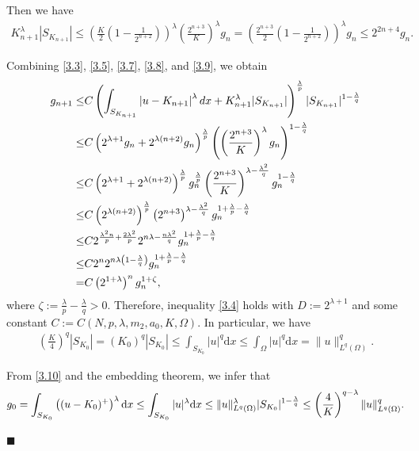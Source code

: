 \documentclass[onecolumn]{autart}
\newenvironment{proof}{{\it Proof: \enspace}}{\hfill $\blacksquare$\par}
\begin{document}
\begin{proof}
		Then we have
		\begin{align}\label{3.9}
			K_{n+1}^\lambda |S_{K_{n+1}}| \leq \left(\frac{K}{2} \left(1 - \frac{1}{2^{n+2}}\right)\right)^\lambda \left(\frac{2^{n+3}}{K}\right)^\lambda g_n = \left(\frac{2^{n+3}}{2} \left(1 - \frac{1}{2^{n+2}}\right)\right)^\lambda g_n \leq 2^{2n+4} g_n.
		\end{align}
		
		Combining  \eqref{3.3}, \eqref{3.5}, \eqref{3.7}, \eqref{3.8}, and \eqref{3.9}, we obtain
		\begin{align}
			g_{n+1}
			\leq
			& C \left( \int_{S_{K_{n+1}}} \left|u- K_{n+1} \right|^\lambda dx + K_{n+1}^\lambda |S_{K_{n+1}}| \right)^{\frac{\lambda}{p}} |S_{K_{n+1}}|^{1-\frac{\lambda}{q}}
			\notag \\ \leq
			& C \left( 2^{\lambda+1}g_n + 2^{\lambda (n+2)} g_n \right)^{\frac{\lambda}{p}} \left( \left(\frac{2^{n+3}}{K}\right)^\lambda g_n\right)^{1-\frac{\lambda}{q}}
			\notag \\ \leq
			& C \left(  2^{\lambda+1} + 2^{\lambda (n+2)} \right)^{\frac{\lambda}{p}} g_n^{\frac{\lambda}{p}} \left( \frac{2^{n+3}}{K}\right)^{\lambda-\frac{\lambda^2}{q}} g_n^{1-\frac{\lambda}{q}}
			\notag \\ \leq
			& C \left( 2^{\lambda (n+2)}\right)^{\frac{\lambda}{p}} \left(2^{n+3}\right)^{\lambda-\frac{\lambda^2}{q}} g_n^{1+{\frac{\lambda}{p}}-\frac{\lambda}{q}}
			\notag \\ \leq
			& C2^{\frac{\lambda^2 n}{p}+\frac{2\lambda^2 }{p}} 2^{n\lambda-\frac{n\lambda^2}{q}} g_n^{1+{\frac{\lambda}{p}}-\frac{\lambda}{q}}
			\notag \\ \leq
			& C 2^n 2^{n\lambda\left(1-\frac{\lambda}{q}\right)}g_n^{1+{\frac{\lambda}{p}}-\frac{\lambda}{q}}
			\notag \\  =
			&C\left(2^{ 1+\lambda }\right)^n g_n^{1+\zeta},\notag
		\end{align}
		where $\zeta := \frac{\lambda}{p} - \frac{\lambda}{q} > 0$.
		Therefore, inequality \eqref{3.4} holds with $D := 2^{\lambda+1}$ and some constant $C := C(N, p, \lambda,  m_2,  a_0, K, \Omega)$. In particular, we have
		\begin{align}
			\left(\frac{K}{4}\right)^{q} |S_{K_0}| = (K_0)^{q} |S_{K_0}| \leq \int_{S_{K_0}} |u|^{q}  \mathrm{d}x  \leq \int_{\Omega} |u|^{q}  \mathrm{d}x =  \|u\|_{L^{q}(\Omega)}^{q}.\label{3.10}
		\end{align}
		
		From \eqref{3.10} and the embedding theorem, we infer that
		\begin{align}
			g_0 = \int_{S_{K_0}} \left((u- K_0)^+\right)^\lambda \mathrm{d}x \leq \int_{S_{K_0}} |u|^\lambda \mathrm{d}x \leq \|u\|_{L^{q}(\Omega)}^\lambda |S_{K_0}|^{1-\frac{\lambda}{q}} \leq \left(\frac{4}{K}\right)^{q-\lambda} \|u\|_{L^{q}(\Omega)}^{q}.\notag
		\end{align}
		

\end{proof}
\end{document}
